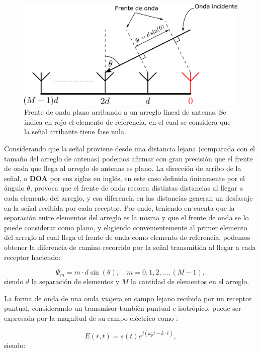 \begin{figure}[ht]
    \centering
    \includegraphics[width=0.8\linewidth]{images/02-Beamforming/caso1d.png}
    \caption{Frente de onda plano arribando a un arreglo lineal de antenas. Se indica en rojo el elemento de referencia, en el cual se considera que la señal arribante tiene fase nula.}
    \label{fig:beamforming_caso1d}
\end{figure}

Considerando que la señal proviene desde una distancia lejana (comparada con el tamaño del arreglo de antenas) podemos afirmar con gran precisión que el frente de onda que llega al arreglo de antenas es plano. La dirección de arribo de la señal, o \textbf{DOA} por sus siglas en inglés, en este caso definida únicamente por el ángulo $\theta$, provoca que el frente de onda recorra distintas distancias al llegar a cada elemento del arreglo, y esa diferencia en las distancias generan un desfasaje en la señal recibida por cada receptor. Por ende, teniendo en cuenta que la separación entre elementos del arreglo es la misma y que el frente de onda se lo puede considerar como plano, y eligiendo convenientemente al primer elemento del arreglo al cual llega el frente de onda como elemento de referencia, podemos obtener la diferencia de camino recorrido por la señal transmitida al llegar a cada receptor haciendo:

\begin{equation}
    \Psi_m = m\cdot d\sin(\theta),\quad m=0,1,2,...,(M-1),
\end{equation}
siendo $d$ la separación de elementos y $M$ la cantidad de elementos en el arreglo.

La forma de onda de una onda viajera en campo lejano recibida por un receptor puntual, considerando un transmisor también puntual e isotrópico, puede ser expresada por la magnitud de su campo eléctrico como \cite{bib:2decadesp69}:

\begin{equation}
    E(\bar{r},t)=s(t)e^{j(\omega_p t - \bar{k}\cdot\bar{r})},
\end{equation}
siendo:

